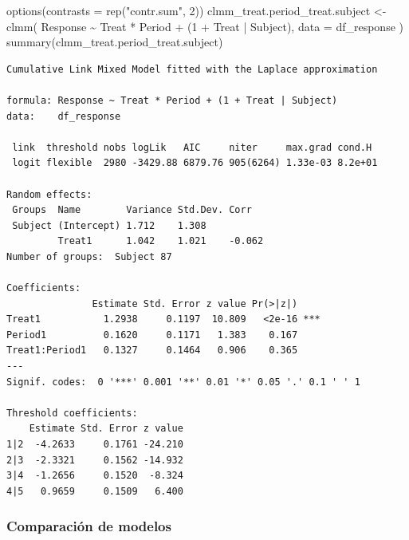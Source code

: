 \documentclass[
  12pt,
  a4paper,
  extrafontsizes,
  onecolumn,
  openright,
  table]{memoir}
\newenvironment{Shaded}{\begin{snugshade}}{\end{snugshade}}
\newcommand{\AttributeTok}[1]{\textcolor[rgb]{0.40,0.45,0.13}{#1}}
\newcommand{\DecValTok}[1]{\textcolor[rgb]{0.68,0.00,0.00}{#1}}
\newcommand{\FunctionTok}[1]{\textcolor[rgb]{0.28,0.35,0.67}{#1}}
\newcommand{\NormalTok}[1]{\textcolor[rgb]{0.00,0.23,0.31}{#1}}
\newcommand{\OtherTok}[1]{\textcolor[rgb]{0.00,0.23,0.31}{#1}}
\newcommand{\SpecialCharTok}[1]{\textcolor[rgb]{0.37,0.37,0.37}{#1}}
\newcommand{\StringTok}[1]{\textcolor[rgb]{0.13,0.47,0.30}{#1}}
\begin{document}
\scriptsize

\begin{Shaded}
\begin{Highlighting}[]
\FunctionTok{options}\NormalTok{(}\AttributeTok{contrasts =} \FunctionTok{rep}\NormalTok{(}\StringTok{"contr.sum"}\NormalTok{, }\DecValTok{2}\NormalTok{))}
\NormalTok{clmm\_treat.period\_treat.subject }\OtherTok{\textless{}{-}} \FunctionTok{clmm}\NormalTok{(}
\NormalTok{    Response }\SpecialCharTok{\textasciitilde{}}\NormalTok{ Treat }\SpecialCharTok{*}\NormalTok{ Period }\SpecialCharTok{+}\NormalTok{ (}\DecValTok{1} \SpecialCharTok{+}\NormalTok{ Treat }\SpecialCharTok{|}\NormalTok{ Subject),}
    \AttributeTok{data =}\NormalTok{ df\_response}
\NormalTok{)}
\FunctionTok{summary}\NormalTok{(clmm\_treat.period\_treat.subject)}
\end{Highlighting}
\end{Shaded}

\begin{verbatim}
Cumulative Link Mixed Model fitted with the Laplace approximation

formula: Response ~ Treat * Period + (1 + Treat | Subject)
data:    df_response

 link  threshold nobs logLik   AIC     niter     max.grad cond.H 
 logit flexible  2980 -3429.88 6879.76 905(6264) 1.33e-03 8.2e+01

Random effects:
 Groups  Name        Variance Std.Dev. Corr   
 Subject (Intercept) 1.712    1.308           
         Treat1      1.042    1.021    -0.062 
Number of groups:  Subject 87 

Coefficients:
               Estimate Std. Error z value Pr(>|z|)    
Treat1           1.2938     0.1197  10.809   <2e-16 ***
Period1          0.1620     0.1171   1.383    0.167    
Treat1:Period1   0.1327     0.1464   0.906    0.365    
---
Signif. codes:  0 '***' 0.001 '**' 0.01 '*' 0.05 '.' 0.1 ' ' 1

Threshold coefficients:
    Estimate Std. Error z value
1|2  -4.2633     0.1761 -24.210
2|3  -2.3321     0.1562 -14.932
3|4  -1.2656     0.1520  -8.324
4|5   0.9659     0.1509   6.400
\end{verbatim}

\normalsize

\hypertarget{comparaciuxf3n-de-modelos}{%
\subsubsection{Comparación de modelos}\label{comparaciuxf3n-de-modelos}}
\end{document}
